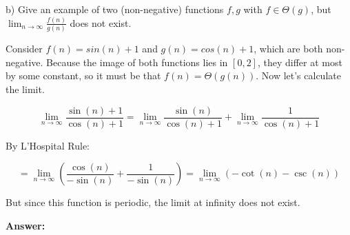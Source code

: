\documentclass[a4paper]{article}
\begin{document}
\noindent b) Give an example of two (non-negative) functions $f,g$ with $f \in \Theta(g)$, but $\lim_{n \rightarrow \infty}\frac{f(n)}{g(n)}$ does not exist. 

\bigskip Consider $f(n) = sin(n) + 1$ and $g(n) = cos(n) + 1$, which are both non-negative. Because the image of both functions lies in $[0, 2]$, they differ at most by some constant, so it must be that $f(n) = \Theta(g(n))$.
Now let's calculate the limit.

$$\lim_{n \rightarrow \infty} \frac{\sin(n) + 1}{\cos(n) + 1} = 
\lim_{n \rightarrow \infty} \frac{\sin(n)}{\cos(n) + 1} + \lim_{n \rightarrow \infty} \frac{1}{\cos(n) + 1}$$

By L'Hospital Rule:

 
$$= \lim_{n \rightarrow \infty} \left ( \frac{\cos(n)}{-\sin(n)} + \frac{1}{-\sin(n)} \right )= \lim_{n \rightarrow \infty} \left (- \cot (n) - \csc (n) \right )$$

But since this function is periodic, the limit at infinity does not exist.

\bigskip \noindent \textbf{Answer:}
\end{document}

